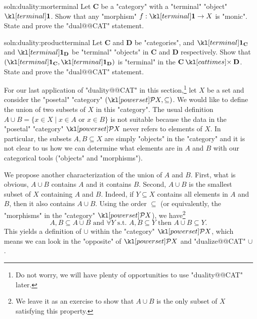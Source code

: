 \documentclass[main.tex]{subfiles}
\begin{document}
\begin{exer}{soln:duality:morterminal}\label{exer:duality:morterminal}
	Let $\mathbf{C}$ be a "category" with a "terminal" "object" $\terminal$. Show that any "morphism" $f: \terminal \rightarrow X$ is "monic". State and prove the "dual@@CAT" statement.
\end{exer}
\begin{exer}{soln:duality:productterminal}\label{exer:duality:productterminal}
	Let $\mathbf{C}$ and $\mathbf{D}$ be "categories", and $\terminal_{\mathbf{C}}$ and $\terminal_{\mathbf{D}}$ be "terminal" "objects" in $\mathbf{C}$ and $\mathbf{D}$ respectively. Show that $(\terminal_{\mathbf{C}},\terminal_{\mathbf{D}})$ is "terminal" in the $\mathbf{C} \cattimes \mathbf{D}$. State and prove the "dual@@CAT" statement.
\end{exer}
\begin{exmp}\label{exmp:unions}%
For our last application of "duality@@CAT" in this section,\footnote{Do not worry, we will have plenty of opportunities to use "duality@@CAT" later.} let $X$ be a set and consider the "posetal" "category" $(\mP X, \subseteq)$. We would like to define the union of two subsets of $X$ in this "category". The usual definition $A \cup B = \{x \in X \mid x \in A \text{ or } x \in B\}$ is not suitable because the data in the "posetal" "category" $\mP X$ never refers to elements of $X$. In particular, the subsets $A,B \subseteq X$ are simply "objects" in the "category" and it is not clear to us how we can determine what elements are in $A$ and $B$ with our categorical tools ("objects" and "morphisms").

We propose another characterization of the union of $A$ and $B$. First, what is obvious, $A \cup B$ contains $A$ and it contains $B$. Second, $A \cup B$ is the smallest subset of $X$ containing $A$ and $B$. Indeed, if $Y \subseteq X$ contains all elements in $A$ and $B$, then it also contains $A \cup B$. Using the order $\subseteq$ (or equivalently, the "morphisms" in the "category" $\mP X$), we have\footnote{We leave it as an exercise to show that $A \cup B$ is the only subset of $X$ satisfying this property.} \[A, B \subseteq A\cup B \text{ and }\forall Y \text{ s.t. } A, B \subseteq Y \text{ then } A\cup B \subseteq Y.\] This yields a definition of $\cup$ within the "category" $\mP X$, which means we can look in the "opposite" of $\mP X$ and "dualize@@CAT" $\cup$.


\end{exmp}
\end{document}
